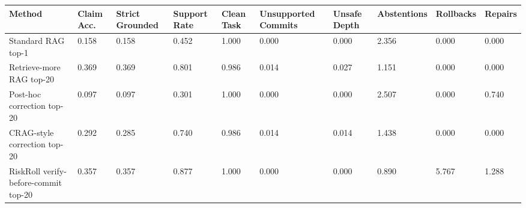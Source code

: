 \begin{tabular}{llllllllll}
\toprule
Method & Claim Acc. & Strict Grounded & Support Rate & Clean Task & Unsupported Commits & Unsafe Depth & Abstentions & Rollbacks & Repairs \\
\midrule
Standard RAG top-1 & 0.158 & 0.158 & 0.452 & 1.000 & 0.000 & 0.000 & 2.356 & 0.000 & 0.000 \\
Retrieve-more RAG top-20 & 0.369 & 0.369 & 0.801 & 0.986 & 0.014 & 0.027 & 1.151 & 0.000 & 0.000 \\
Post-hoc correction top-20 & 0.097 & 0.097 & 0.301 & 1.000 & 0.000 & 0.000 & 2.507 & 0.000 & 0.740 \\
CRAG-style correction top-20 & 0.292 & 0.285 & 0.740 & 0.986 & 0.014 & 0.014 & 1.438 & 0.000 & 0.000 \\
RiskRoll verify-before-commit top-20 & 0.357 & 0.357 & 0.877 & 1.000 & 0.000 & 0.000 & 0.890 & 5.767 & 1.288 \\
\bottomrule
\end{tabular}
